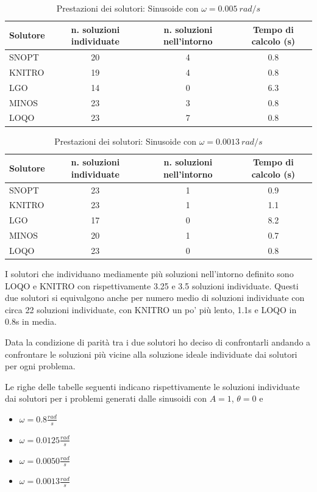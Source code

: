 \documentclass[a4paper,12pt]{report}
\begin{document}
\begin{table}
  \caption{Prestazioni dei solutori: Sinusoide con $\omega = 0.005~rad/s$}
  \label{tab:prestazioni_sol005}
  \center
    \begin{tabular}{lSSS}
      \toprule
      {Solutore} & {n. soluzioni individuate} & {n. soluzioni nell'intorno} & {Tempo di calcolo (s)} \\
      \midrule
      SNOPT & 20 & 4 & 0.8 \\
      KNITRO & 19 & 4 & 0.8 \\
      LGO &  14 & 0 &  6.3  \\
      MINOS & 23  &  3  &  0.8 \\
      LOQO  & 23 &  7  & 0.8 \\
      \bottomrule
    \end{tabular}
\end{table}

\begin{table}[H]
  \caption{Prestazioni dei solutori: Sinusoide con $\omega = 0.0013~rad/s$}
  \label{tab:prestazioni_sol0013}
  \center
    \begin{tabular}{lSSS}
      \toprule
      {Solutore} & {n. soluzioni individuate} & {n. soluzioni nell'intorno} & {Tempo di calcolo (s)} \\
      \midrule
      SNOPT & 23 & 1 & 0.9 \\
      KNITRO & 23 & 1 & 1.1 \\
      LGO & 17  & 0 & 8.2  \\
      MINOS & 20  &  1  &  0.7 \\
      LOQO  & 23  &  0  & 0.8 \\
      \bottomrule
    \end{tabular}
\end{table}

I solutori che individuano mediamente più soluzioni nell'intorno definito sono LOQO e KNITRO con rispettivamente 3.25 e 3.5 soluzioni individuate. Questi due solutori si equivalgono anche per  numero medio di soluzioni individuate con circa 22 soluzioni individuate, con KNITRO un po' più lento, 1.1s e LOQO in 0.8s in media.

Data la condizione di parità tra i due solutori ho deciso di confrontarli andando a confrontare le soluzioni più vicine alla soluzione ideale individuate dai solutori per ogni problema.

Le righe delle tabelle seguenti indicano rispettivamente le soluzioni individuate dai solutori per i problemi generati dalle sinusoidi con $A=1$, $\theta=0$ e
\begin{itemize}
  \item $\omega = 0.8 \frac{rad}{s}$
  \item $\omega = 0.0125 \frac{rad}{s}$
  \item $\omega = 0.0050 \frac{rad}{s}$
  \item $\omega = 0.0013 \frac{rad}{s}$
\end{itemize}
\end{document}
